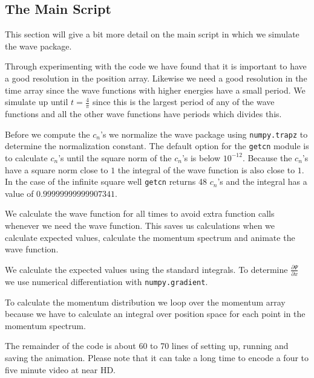 \documentclass[12pt,a4paper]{article}
\newcommand{\pdiff}[2]{\frac{\partial #1}{\partial #2}}
\begin{document}
\subsection{The Main Script} \label{app:mainScript}
This section will give a bit more detail on the main script in which we simulate the wave package.



Through experimenting with the code we have found that it is important to have a good resolution in the position array. Likewise we need a good resolution in the time array since the wave functions with higher energies have a small period. We simulate up until $t = \frac{4}{\pi}$ since this is the largest period of any of the wave functions and all the other wave functions have periods which divides this.



Before we compute the $c_n$'s we normalize the wave package using \lstinline{numpy.trapz} to determine the normalization constant. The default option for the \verb!getcn! module is to calculate $c_n$'s until the square norm of the $c_n$'s is below $10^{-12}$. Because the $c_n$'s have a square norm close to $1$ the integral of the wave function is also close to $1$. In the case of the infinite square well \lstinline{getcn} returns 48 $c_n$'s and the integral has a value of $0.99999999999907341$.



We calculate the wave function for all times to avoid extra function calls whenever we need the wave function. This saves us calculations when we calculate expected values, calculate the momentum spectrum and animate the wave function.



We calculate the expected values using the standard integrals. To determine $\pdiff{\Psi}{x}$ we use numerical differentiation with \lstinline{numpy.gradient}.


To calculate the momentum distribution we loop over the momentum array because we have to calculate an integral over position space for each point in the momentum spectrum.

The remainder of the code is about 60 to 70 lines of setting up, running and saving the animation. Please note that it can take a long time to encode a four to five minute video at near HD.
\end{document}
